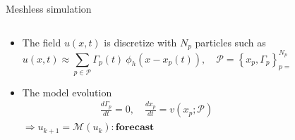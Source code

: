 \documentclass[aspectratio=169]{beamer} %
\begin{document}
\begin{frame}{Meshless simulation}
\begin{columns}[t]
\begin{column}{0.7\textwidth}
\begin{itemize}
                \item<2-> The field $u(x, t)$ is discretize with $N_p$ particles such as
                    \begin{equation*}
                        u(x, t) \approx \sum_{p \in \mathcal P} \Gamma_p(t)~\phi_h(x - x_p(t)), \quad \mathcal P = \left\{x_p, \Gamma_p\right\}_{p=1}^{N_p}
                    \end{equation*}
                \item<3-> The model evolution
                    \begin{eqnarray*}
                        \frac{d\Gamma_p}{dt} = 0, \quad \frac{d x_p}{d t} = v(x_p; \mathcal P)
                    \end{eqnarray*}
                    $\Rightarrow u_{k+1} = \mathcal M(u_{k}): \textbf{forecast}$
            \end{itemize}
        \end{column}
        \begin{column}{0.3\textwidth}
            \begin{figure}
                \centering
            \end{figure}
        \end{column}
    \end{columns}
\end{frame}
\end{document}
